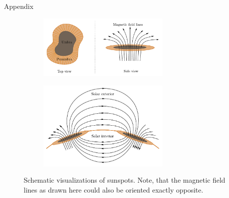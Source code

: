 \documentclass{beamer}
\begin{document}
\begin{frame}[allowframebreaks]{Appendix}
	\begin{figure}[h]
		\centering
		\begin{subfigure}{0.49\textwidth}
			\centering
			\includegraphics[width=0.7\textwidth]{figures/thesis/Sunspotsschematic.pdf}
		\end{subfigure}\hfill
		\begin{subfigure}{0.49\textwidth}
			\centering
			\includegraphics[width=0.7\textwidth]{figures/thesis/bipolarsunspots.pdf}
		\end{subfigure}
		\label{fig:sunspots}
		\caption{Schematic visualizations of sunspots. Note, that the magnetic field lines as drawn here could also be oriented exactly opposite.}
	\end{figure}
\end{frame}
\end{document}
